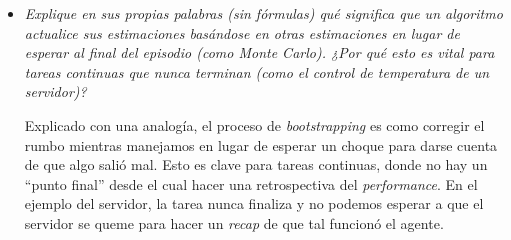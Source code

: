 \documentclass[11pt]{article}
\begin{document}
\begin{itemize}[leftmargin=*, itemsep=0.8em]

\item \textit{Explique en sus propias palabras (sin fórmulas) qué significa que un algoritmo actualice sus
    estimaciones basándose en otras estimaciones en lugar de esperar al final del episodio (como Monte Carlo).
    ¿Por qué esto es vital para tareas continuas que nunca terminan (como el control de temperatura de un servidor)?}

    Explicado con una analogía, el proceso de \textit{bootstrapping} es como corregir el rumbo mientras manejamos
    en lugar de esperar un choque para darse cuenta de que algo salió mal. Esto es clave para tareas continuas,
    donde no hay un ``punto final'' desde el cual hacer una retrospectiva del \textit{performance}. En el ejemplo
    del servidor, la tarea nunca finaliza y no podemos esperar a que el servidor se queme para hacer un
    \textit{recap} de que tal funcionó el agente.

\end{itemize}
\end{document}
